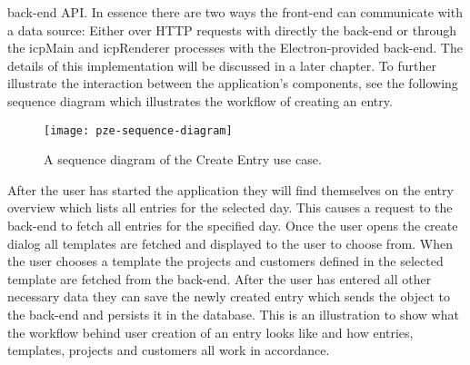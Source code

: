back-end API.
In essence there are two ways the front-end can communicate with a data source:
Either over HTTP requests with directly the back-end or through the icpMain and icpRenderer processes with the Electron-provided back-end.
The details of this implementation will be discussed in a later chapter. 
To further illustrate the interaction between the application's components, see the following sequence diagram which illustrates
the workflow of creating an entry. 
\begin{figure}[H]
  \centering
  \texttt{[image: pze-sequence-diagram]}
  \caption{A sequence diagram of the Create Entry use case.}
  \label{fig:pze-sequence-diagram}
\end{figure}
After the user has started the application they will find themselves on the entry overview which lists all entries for the selected day.
This causes a request to the back-end to fetch all entries for the specified day. 
Once the user opens the create dialog all templates are fetched and displayed to the user to choose from. 
When the user chooses a template the projects and customers defined in the selected template are fetched from the back-end. 
After the user has entered all other necessary data they can save the newly created entry which sends the object to the back-end 
and persists it in the database. 
This is an illustration to show what the workflow behind user creation of an entry looks like and how 
entries, templates, projects and customers all work in accordance.